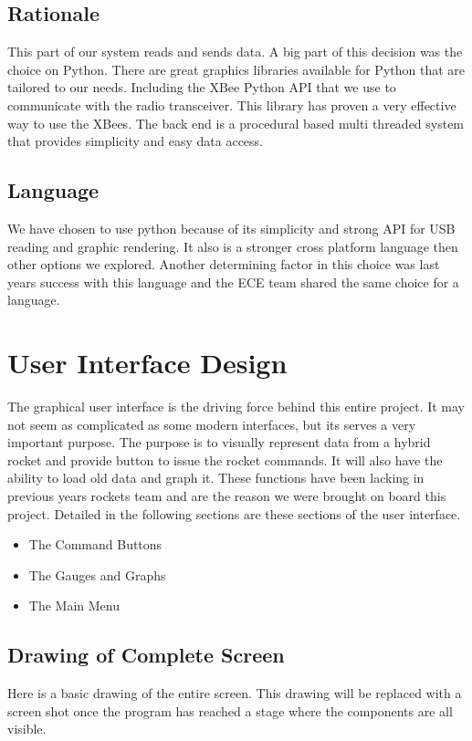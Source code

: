 \documentclass[10pt,draftclsnofoot,onecolumn,compsoc]{IEEEtran}
\begin{document}
\subsection{Rationale}
This part of our system reads and sends data. A big part of this decision was the choice on Python. There are great graphics libraries available for Python that are tailored to our needs. Including the XBee Python API that we use to communicate with the radio transceiver. This library has proven a very effective way to use the XBees. The back end is a procedural based multi threaded system that provides simplicity and easy data access.

\subsection{Language}
We have chosen to use python because of its simplicity and strong API for USB reading and graphic rendering. It also is a stronger cross platform language then other options we explored. Another determining factor in this choice was last years success with this language and the ECE team shared the same choice for a language.

\section{User Interface Design}
The graphical user interface is the driving force behind this entire project. It may not seem as complicated as some modern interfaces, but its serves a very important purpose. The purpose is to visually represent data from a hybrid rocket and provide button to issue the rocket commands. It will also have the ability to load old data and graph it. These functions have been lacking in previous years rockets team and are the reason we were brought on board this project. Detailed in the following sections are these sections of the user interface. \par

\begin{itemize}
\item The Command Buttons
\item The Gauges and  Graphs
\item The Main Menu
\end{itemize}

\subsection{Drawing of Complete Screen}
Here is a basic drawing of the entire screen. This drawing will be replaced with a screen shot once the program has reached a stage where the components are all visible.\par
\end{document}
